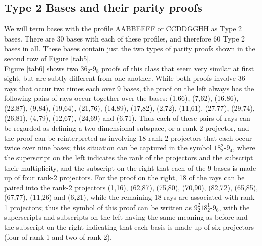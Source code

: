 {\bf \subsection{\label{subsec:type2} Type 2 Bases and their parity proofs }}

We will term bases with the profile AABBEEFF or CCDDGGHH as Type 2 bases. There are 30 bases with each of these profiles, and therefore 60 Type 2 bases in all. These bases contain just the two types of parity proofs shown in the second row of Figure \ref{tab5}.\\

Figure \ref{tab6} shows two $36_{2}$-$9_{8}$ proofs of this class that seem very similar at first sight, but are subtly different from one another. While both proofs involve 36 rays that occur two times each over 9 bases, the proof on the left always has the following pairs of rays occur together over the bases: (1,66), (7,62), (16,86), (22,87), (9,84), (19,64), (21,76), (14,89), (17,82), (2,72), (11,61), (27,77), (29,74), (26,81), (4,79), (12,67), (24,69) and (6,71). Thus each of these pairs of rays can be regarded as defining a two-dimensional subspace, or a rank-2 projector, and the proof can be reinterpreted as involving 18 rank-2 projectors that each occur twice over nine bases; this situation can be captured in the symbol $18^{2}_{2}$-$9_{4}$, where the superscript on the left indicates the rank of the projectors and the subscript their multiplicity, and the subscript on the right that each of the 9 bases is made up of four rank-2 projectors. For the proof on the right, 18 of the rays can be paired into the rank-2 projectors (1,16), (62,87), (75,80), (70,90), (82,72), (65,85), (67,77), (11,26) and (6,21), while the remaining 18 rays are associated with rank-1 projectors; thus the symbol of this proof can be written as $9^{2}_{2}18^{1}_{2}$-$9_{6}$, with the superscripts and subscripts on the left having the same meaning as before and the subscript on the right indicating that each basis is made up of six projectors (four of rank-1 and two of rank-2).\\

